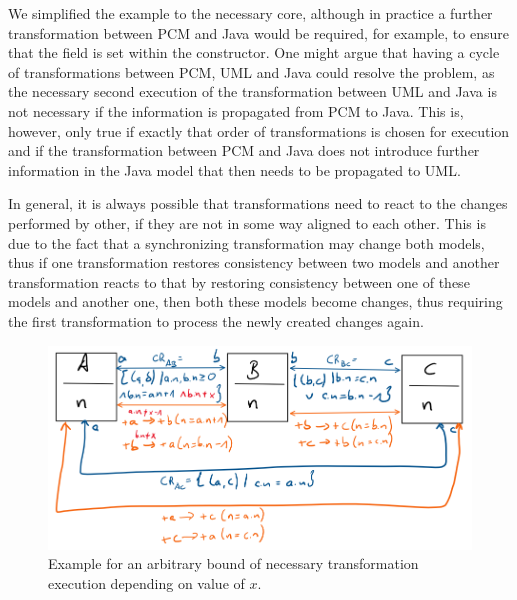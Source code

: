 We simplified the example to the necessary core, although in practice a further transformation between \gls{PCM} and Java would be required, for example, to ensure that the field is set within the constructor.
One might argue that having a cycle of transformations between \gls{PCM}, UML and Java could resolve the problem, as the necessary second execution of the transformation between UML and Java is not necessary if the information is propagated from \gls{PCM} to Java.
This is, however, only true if exactly that order of transformations is chosen for execution and if the transformation between \gls{PCM} and Java does not introduce further information in the Java model that then needs to be propagated to UML.

In general, it is always possible that transformations need to react to the changes performed by other, if they are not in some way aligned to each other.
This is due to the fact that a synchronizing transformation may change both models, thus if one transformation restores consistency between two models and another transformation reacts to that by restoring consistency between one of these models and another one, then both these models become changes, thus requiring the first transformation to process the newly created changes again.

\begin{figure}
    \centering
    \includegraphics[width=\textwidth]{figures/correctness/orchestration/no_upper_bound_example.png}
    \caption[Example for arbitrary bounds of transformation execution]{Example for an arbitrary bound of necessary transformation execution depending on value of $x$.}
    \label{fig:orchestration:no_upper_bound}
\end{figure}

